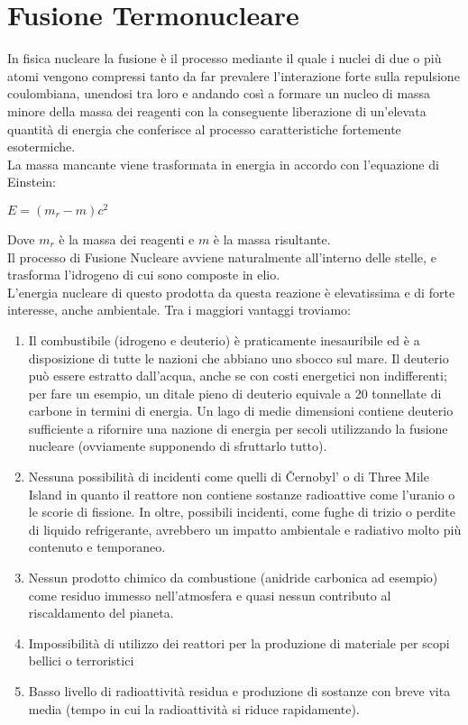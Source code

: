 \section*{Fusione Termonucleare}
In fisica nucleare la fusione è il processo mediante il quale i nuclei di due o più atomi vengono compressi tanto da far prevalere l’interazione forte sulla repulsione coulombiana, unendosi tra loro e andando così a formare un nucleo di massa minore della massa dei reagenti con la conseguente liberazione di un’elevata quantità di energia che conferisce al processo caratteristiche fortemente esotermiche.\\
La massa mancante viene trasformata in energia in accordo con l’equazione di Einstein:
\begin{center}
	 $E = (m_r - m)c^2$
\end{center}
Dove $ m_r $ è la massa dei reagenti e $ m $ è la massa risultante.\\
Il processo di Fusione Nucleare avviene naturalmente all'interno delle stelle, e trasforma l'idrogeno di cui sono composte in elio.\\
L'energia nucleare di questo prodotta da questa reazione è elevatissima e di forte interesse, anche ambientale. Tra i maggiori vantaggi troviamo:
\begin{enumerate}
	\item Il combustibile (idrogeno e deuterio) è praticamente inesauribile ed è a disposizione di tutte le nazioni che abbiano uno sbocco sul mare. Il deuterio può essere estratto dall'acqua, anche se con costi energetici non indifferenti; per fare un esempio, un ditale pieno di deuterio equivale a 20 tonnellate di carbone in termini di energia. Un lago di medie dimensioni contiene deuterio sufficiente a rifornire una nazione di energia per secoli utilizzando la fusione nucleare (ovviamente supponendo di sfruttarlo tutto).
	\item Nessuna possibilità di incidenti come quelli di Černobyl' o di Three Mile Island in quanto il reattore non contiene sostanze radioattive come l'uranio o le scorie di fissione. In oltre, possibili incidenti, come fughe di trizio o perdite di liquido refrigerante, avrebbero un impatto ambientale e radiativo molto più contenuto e temporaneo.
	\item Nessun prodotto chimico da combustione (anidride carbonica ad esempio) come residuo immesso nell'atmosfera e quasi nessun contributo al riscaldamento del pianeta.
	\item Impossibilità di utilizzo dei reattori per la produzione di materiale per scopi bellici o terroristici
	\item Basso livello di radioattività residua e produzione di sostanze con breve vita media (tempo in cui la radioattività si riduce rapidamente).
\end{enumerate}
